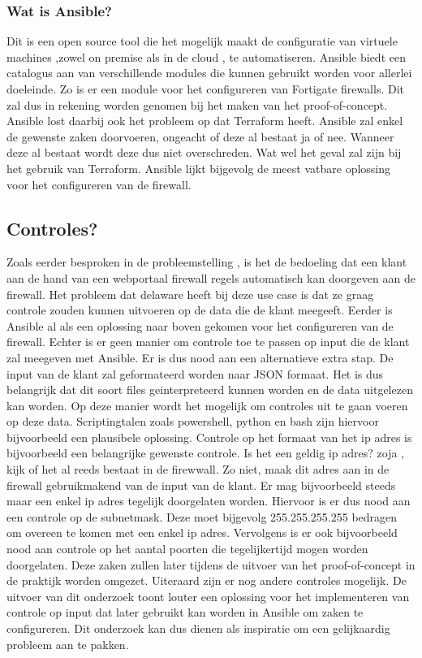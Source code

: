 \subsubsection{Wat is Ansible?}
Dit is een open source tool die het mogelijk maakt de configuratie van virtuele machines ,zowel on premise als in de cloud , te automatiseren. \autocite{Hat} Ansible biedt een catalogus aan van verschillende modules die kunnen gebruikt worden voor allerlei doeleinde. Zo is er een module voor het configureren van Fortigate firewalls. Dit zal dus in rekening worden genomen bij het maken van het proof-of-concept. \autocite{Fortinet2020} Ansible lost daarbij ook het probleem op dat Terraform heeft. Ansible zal enkel de gewenste zaken doorvoeren, ongeacht of deze al bestaat ja of nee. Wanneer deze al bestaat wordt deze dus niet overschreden. Wat wel het geval zal zijn bij het gebruik van Terraform. Ansible lijkt bijgevolg de meest vatbare oplossing voor het configureren van de firewall. 

\subsection{Controles?}

Zoals eerder besproken in de probleemstelling , is het de bedoeling dat een klant aan de hand van een webportaal firewall regels automatisch kan doorgeven aan de firewall. Het probleem dat delaware heeft bij deze use case is dat ze graag controle zouden kunnen uitvoeren op de data die de klant meegeeft. Eerder is Ansible al als een oplossing naar boven gekomen voor het configureren van de firewall. Echter is er geen manier om controle toe te passen op input die de klant zal meegeven met Ansible. Er is dus nood aan een alternatieve extra stap. De input van de klant zal geformateerd worden naar JSON formaat. Het is dus belangrijk dat dit soort files geinterpreteerd kunnen worden en de data uitgelezen kan worden. Op deze manier wordt het mogelijk om controles uit te gaan voeren op deze data. Scriptingtalen zoals powershell, python en bash zijn hiervoor bijvoorbeeld een plausibele oplossing. %
Controle op het formaat van het ip adres is bijvoorbeeld een belangrijke gewenste controle. Is het een geldig ip adres? zoja , kijk of het al reeds bestaat in de firewwall. Zo niet, maak dit adres aan in de firewall gebruikmakend van de input van de klant.  Er mag bijvoorbeeld steeds maar een enkel ip adres tegelijk doorgelaten worden. Hiervoor is er dus nood aan een controle op de subnetmask. Deze moet bijgevolg 255.255.255.255 bedragen om overeen te komen met een enkel ip adres. \autocite{StackExchange2020} Vervolgens is er ook bijvoorbeeld nood aan controle op het aantal poorten die tegelijkertijd mogen worden doorgelaten. Deze zaken zullen later tijdens de uitvoer van het proof-of-concept in de praktijk worden omgezet. Uiteraard zijn er nog andere controles mogelijk. De uitvoer van dit onderzoek toont louter een oplossing voor het implementeren van controle op input dat later gebruikt kan worden in Ansible om zaken te configureren. Dit onderzoek kan dus dienen als inspiratie om een gelijkaardig probleem aan te pakken. 



